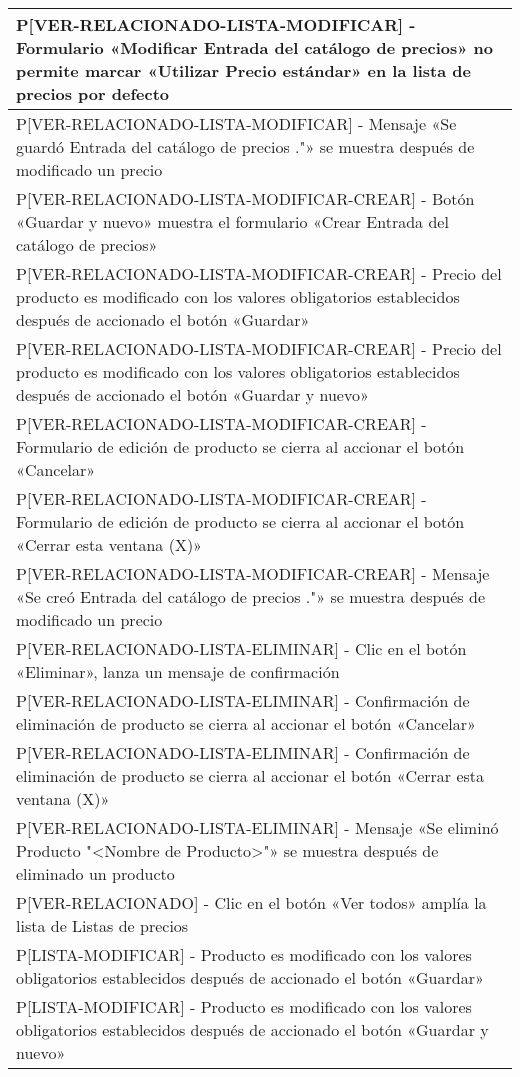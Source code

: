 \begin{longtable}{|p{15.0cm}|}
P[VER-RELACIONADO-LISTA-MODIFICAR] - Formulario «Modificar Entrada del catálogo de precios» no permite marcar «Utilizar Precio estándar» en la lista de precios por defecto \\ \hline
P[VER-RELACIONADO-LISTA-MODIFICAR] - Mensaje «Se guardó Entrada del catálogo de precios ."» se muestra después de modificado un precio \\ \hline
P[VER-RELACIONADO-LISTA-MODIFICAR-CREAR] - Botón «Guardar y nuevo» muestra el formulario «Crear Entrada del catálogo de precios» \\ \hline
P[VER-RELACIONADO-LISTA-MODIFICAR-CREAR] - Precio del producto es modificado con los valores obligatorios establecidos después de accionado el botón «Guardar» \\ \hline
P[VER-RELACIONADO-LISTA-MODIFICAR-CREAR] - Precio del producto es modificado con los valores obligatorios establecidos después de accionado el botón «Guardar y nuevo» \\ \hline
P[VER-RELACIONADO-LISTA-MODIFICAR-CREAR] - Formulario de edición de producto se cierra al accionar el botón «Cancelar» \\ \hline
P[VER-RELACIONADO-LISTA-MODIFICAR-CREAR] - Formulario de edición de producto se cierra al accionar el botón «Cerrar esta ventana (X)» \\ \hline
P[VER-RELACIONADO-LISTA-MODIFICAR-CREAR] - Mensaje «Se creó Entrada del catálogo de precios ."» se muestra después de modificado un precio \\ \hline
P[VER-RELACIONADO-LISTA-ELIMINAR] - Clic en el botón «Eliminar», lanza un mensaje de confirmación \\ \hline
P[VER-RELACIONADO-LISTA-ELIMINAR] - Confirmación de eliminación de producto se cierra al accionar el botón «Cancelar» \\ \hline
P[VER-RELACIONADO-LISTA-ELIMINAR] - Confirmación de eliminación de producto se cierra al accionar el botón «Cerrar esta ventana (X)» \\ \hline
P[VER-RELACIONADO-LISTA-ELIMINAR] - Mensaje «Se eliminó Producto "<Nombre de Producto>"» se muestra después de eliminado un producto \\ \hline
P[VER-RELACIONADO] - Clic en el botón «Ver todos» amplía la lista de Listas de precios \\ \hline
P[LISTA-MODIFICAR] - Producto es modificado con los valores obligatorios establecidos después de accionado el botón «Guardar» \\ \hline
P[LISTA-MODIFICAR] - Producto es modificado con los valores obligatorios establecidos después de accionado el botón «Guardar y nuevo» \\ \hline

\end{longtable}

